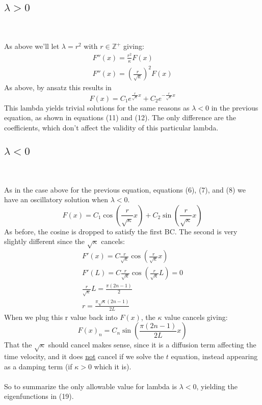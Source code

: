 \documentclass{article}
\begin{document}
\subsection*{$\lambda > 0$}~\\
\\
As above we'll let $\lambda = r^2$ with $r \in \mathbb{Z}^+$ giving:
\begin{equation}
\begin{aligned}
F''(x) = \frac{r^2}{\kappa} F(x)\\
F''(x) = (\frac{r}{\sqrt{\kappa}})^2 F(x)
\end{aligned}
\end{equation}
As above, by ansatz this results in 
\begin{equation}
F(x) = C_1e^{\frac{r}{\sqrt{\kappa}}x} + C_2e^{-\frac{r}{\sqrt{\kappa}}x}
\end{equation}
This lambda yields trivial solutions for the same reasons as $\lambda <0$ in the previous equation, as shown in equations (11) and (12). The only difference are the coefficients, which don't affect the validity of this particular lambda.
\subsection*{$\lambda < 0$}~\\
\\
As in the case above for the previous equation, equations (6), (7), and (8) we have an oscillatory solution when $\lambda<0$. 
\begin{equation}
F(x) = C_1\cos(\frac{r}{\sqrt{\kappa}}x) + C_2\sin(\frac{r}{\sqrt{\kappa}}x)
\end{equation}
As before, the cosine is dropped to satisfy the first BC. The second is very slightly different since the $\sqrt{\kappa}$ cancels:
\begin{equation}
\begin{aligned}
F'(x) = C\frac{r}{\sqrt{\kappa}}\cos(\frac{r}{\sqrt{\kappa}}x)\\
F'(L) = C\frac{r}{\sqrt{\kappa}}\cos(\frac{r}{\sqrt{\kappa}}L) = 0\\
\frac{r}{\sqrt{\kappa}}L = \frac{\pi(2n-1)}{2}\\
r = \frac{\pi\sqrt{\kappa}(2n-1)}{2L}
\end{aligned}
\end{equation}
When we plug this r value back into $F(x)$, the $\kappa$ value cancels giving:
\begin{equation}
F(x)_n = C_n\sin(\frac{\pi(2n-1)}{2L}x)
\end{equation}
That the $\sqrt{\kappa}$ should cancel makes sense, since it is a diffusion term affecting the time velocity, and it does \underline{not} cancel if we solve the $t$ equation, instead appearing as a damping term (if $\kappa > 0$ which it is).\\
\\
So to summarize the only allowable value for lambda is $\lambda < 0$, yielding the eigenfunctions in (19).
\end{document}
